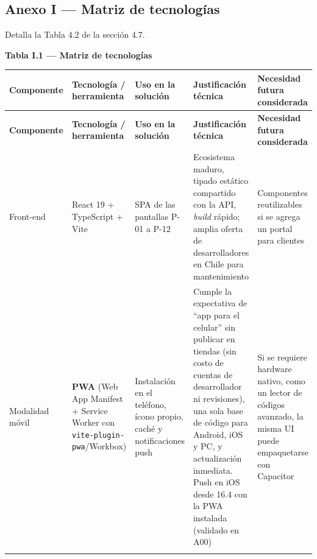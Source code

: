 \documentclass[11pt,a4paper]{article}
\begin{document}
\newpage
\subsection*{Anexo I --- Matriz de tecnologías}

Detalla la Tabla 4.2 de la sección 4.7.

\textbf{Tabla I.1 --- Matriz de tecnologías}\nopagebreak

\begingroup\small
\begin{longtable}{@{}>{\raggedright\arraybackslash\hspace{0pt}}p{}>{\raggedright\arraybackslash\hspace{0pt}}p{}>{\raggedright\arraybackslash\hspace{0pt}}p{}>{\raggedright\arraybackslash\hspace{0pt}}p{}>{\raggedright\arraybackslash\hspace{0pt}}p{}@{}}
\toprule
\textbf{Componente} & \textbf{Tecnología / herramienta} & \textbf{Uso en la solución} & \textbf{Justificación técnica} & \textbf{Necesidad futura considerada} \\ \midrule
\endfirsthead
\toprule
\textbf{Componente} & \textbf{Tecnología / herramienta} & \textbf{Uso en la solución} & \textbf{Justificación técnica} & \textbf{Necesidad futura considerada} \\ \midrule
\endhead
\bottomrule
\endlastfoot
Front-end & React 19 + TypeScript + Vite & SPA de las pantallas \mbox{P-01} a \mbox{P-12} & Ecosistema maduro, tipado estático compartido con la API, \textit{build} rápido; amplia oferta de desarrolladores en Chile para mantenimiento & Componentes reutilizables si se agrega un portal para clientes \\ \addlinespace[0.25em]
Modalidad móvil & \textbf{PWA} (Web App Manifest + Service Worker con \texttt{vite-{}\allowbreak{}plugin-{}\allowbreak{}pwa}/Workbox) & Instalación en el teléfono, ícono propio, caché y notificaciones push & Cumple la expectativa de ``app para el celular'' sin publicar en tiendas (sin costo de cuentas de desarrollador ni revisiones), una sola base de código para Android, iOS y PC, y actualización inmediata. Push en iOS desde 16.4 con la PWA instalada (validado en A00) & Si se requiere hardware nativo, como un lector de códigos avanzado, la misma UI puede empaquetarse con Capacitor \\ \addlinespace[0.25em]

\end{longtable}
\end{document}
